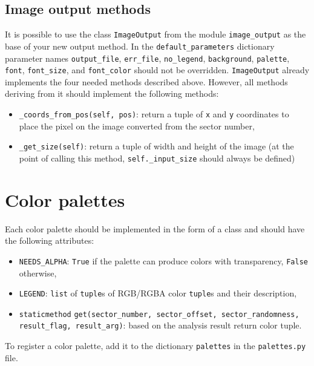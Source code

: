 \documentclass[
  digital, %
  color,   %
  oneside, %
  lof,     %
  nolot,     %
]{fithesis4}
\begin{document}
\subsection{Image output methods}
It is possible to use the class \texttt{ImageOutput} from the module \texttt{image\_output} as the base of your new output method.
In the \texttt{default\_parameters} dictionary parameter names \texttt{output\_file}, \texttt{err\_file}, \texttt{no\_legend}, \texttt{background}, \texttt{palette}, \texttt{font}, \texttt{font\_size}, and \texttt{font\_color} should not be overridden.
\texttt{ImageOutput} already implements the four needed methods described above.
However, all methods deriving from it should implement the following methods:
\begin{itemize}
  \item \texttt{\_coords\_from\_pos(self, pos)}: return a tuple of \texttt{x} and \texttt{y} coordinates to place the pixel on the image converted from the sector number,
  \item \texttt{\_get\_size(self)}: return a tuple of width and height of the image (at the point of calling this method, \texttt{self.\_input\_size} should always be defined)
\end{itemize}

\section{Color palettes}
Each color palette should be implemented in the form of a class and should have the following attributes:
\begin{itemize}
  \item \texttt{NEEDS\_ALPHA}: \texttt{True} if the palette can produce colors with transparency, \texttt{False} otherwise,
  \item \texttt{LEGEND}: \texttt{list} of \texttt{tuple}s of RGB/RGBA color \texttt{tuple}s and their description,
  \item \texttt{staticmethod} \texttt{get(sector\_number, sector\_offset, sector\_randomness, result\_flag, result\_arg)}: based on the analysis result return color tuple.
\end{itemize}
To register a color palette, add it to the dictionary \texttt{palettes} in the \texttt{palettes.py} file.
\end{document}
